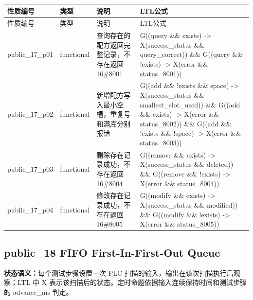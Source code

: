 \begin{longtable}{L{2.3cm}L{1.7cm}L{4.1cm}L{5.2cm}}

\toprule

性质编号 & 类型 & 说明 & LTL公式\\

\midrule

\endfirsthead

\toprule

性质编号 & 类型 & 说明 & LTL公式\\

\midrule

\endhead

{\ttfamily public\_17\_p01} & functional & 查询存在的配方返回完整记录，不存在返回 16\#8001 & {\ttfamily G((query \&\& exists) -> X(success\_status \&\& query\_correct)) \&\& G((query \&\& !exists) -> X(error \&\& status\_8001))}\\

{\ttfamily public\_17\_p02} & functional & 新增配方写入最小空槽，重复号和满库分别报错 & {\ttfamily G((add \&\& !exists \&\& space) -> X(success\_status \&\& smallest\_slot\_used)) \&\& G((add \&\& exists) -> X(error \&\& status\_8002)) \&\& G((add \&\& !exists \&\& !space) -> X(error \&\& status\_8003))}\\

{\ttfamily public\_17\_p03} & functional & 删除存在记录成功，不存在返回 16\#8004 & {\ttfamily G((remove \&\& exists) -> X(success\_status \&\& deleted)) \&\& G((remove \&\& !exists) -> X(error \&\& status\_8004))}\\

{\ttfamily public\_17\_p04} & functional & 修改存在记录成功，不存在返回 16\#8005 & {\ttfamily G((modify \&\& exists) -> X(success\_status \&\& modified)) \&\& G((modify \&\& !exists) -> X(error \&\& status\_8005))}\\

\bottomrule

\end{longtable}

\subsection{{\ttfamily public\_18} FIFO First-In-First-Out Queue}

\noindent\textbf{状态语义：}每个测试步骤设置一次 PLC 扫描的输入，输出在该次扫描执行后观察；LTL 中 X 表示该扫描后的状态。定时命题依据输入连续保持时间和测试步骤的 advance\_ms 判定。


